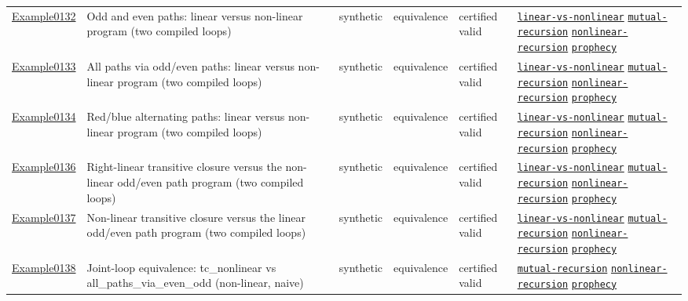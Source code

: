 \documentclass[10pt]{article}
\begin{document}
\begin{longtable}{@{}lp{}p{}p{}p{}p{}@{}}
\hyperref[case:Example0132]{Example0132} & Odd and even paths: linear versus non-linear program (two compiled loops) & synthetic & equivalence & certified valid & {\scriptsize \hyperref[tag:linear-vs-nonlinear]{\texttt{linear-vs-nonlinear}} \hyperref[tag:mutual-recursion]{\texttt{mutual-recursion}} \hyperref[tag:nonlinear-recursion]{\texttt{nonlinear-recursion}} \hyperref[tag:prophecy]{\texttt{prophecy}}} \\
\hyperref[case:Example0133]{Example0133} & All paths via odd/even paths: linear versus non-linear program (two compiled loops) & synthetic & equivalence & certified valid & {\scriptsize \hyperref[tag:linear-vs-nonlinear]{\texttt{linear-vs-nonlinear}} \hyperref[tag:mutual-recursion]{\texttt{mutual-recursion}} \hyperref[tag:nonlinear-recursion]{\texttt{nonlinear-recursion}} \hyperref[tag:prophecy]{\texttt{prophecy}}} \\
\hyperref[case:Example0134]{Example0134} & Red/blue alternating paths: linear versus non-linear program (two compiled loops) & synthetic & equivalence & certified valid & {\scriptsize \hyperref[tag:linear-vs-nonlinear]{\texttt{linear-vs-nonlinear}} \hyperref[tag:mutual-recursion]{\texttt{mutual-recursion}} \hyperref[tag:nonlinear-recursion]{\texttt{nonlinear-recursion}} \hyperref[tag:prophecy]{\texttt{prophecy}}} \\
\hyperref[case:Example0136]{Example0136} & Right-linear transitive closure versus the non-linear odd/even path program (two compiled loops) & synthetic & equivalence & certified valid & {\scriptsize \hyperref[tag:linear-vs-nonlinear]{\texttt{linear-vs-nonlinear}} \hyperref[tag:mutual-recursion]{\texttt{mutual-recursion}} \hyperref[tag:nonlinear-recursion]{\texttt{nonlinear-recursion}} \hyperref[tag:prophecy]{\texttt{prophecy}}} \\
\hyperref[case:Example0137]{Example0137} & Non-linear transitive closure versus the linear odd/even path program (two compiled loops) & synthetic & equivalence & certified valid & {\scriptsize \hyperref[tag:linear-vs-nonlinear]{\texttt{linear-vs-nonlinear}} \hyperref[tag:mutual-recursion]{\texttt{mutual-recursion}} \hyperref[tag:nonlinear-recursion]{\texttt{nonlinear-recursion}} \hyperref[tag:prophecy]{\texttt{prophecy}}} \\
\hyperref[case:Example0138]{Example0138} & Joint-loop equivalence: tc\_nonlinear vs all\_paths\_via\_even\_odd (non-linear, naive) & synthetic & equivalence & certified valid & {\scriptsize \hyperref[tag:mutual-recursion]{\texttt{mutual-recursion}} \hyperref[tag:nonlinear-recursion]{\texttt{nonlinear-recursion}} \hyperref[tag:prophecy]{\texttt{prophecy}}} \\

\end{longtable}
\end{document}
